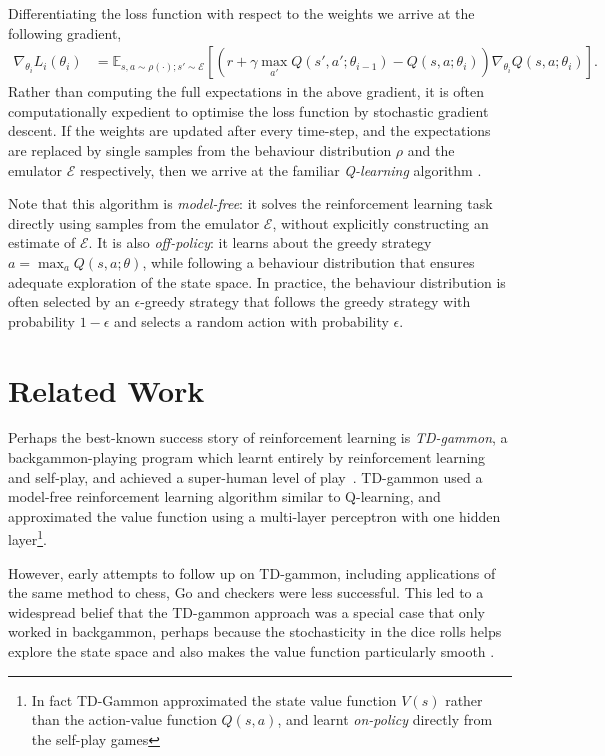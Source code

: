 \documentclass{article} %
\begin{document}
Differentiating the loss function with respect to the weights we arrive at the following gradient,
%
\begin{align}
\nabla_{\theta_i} L_i\left(\theta_i\right) &= \mathbb{E}_{s,a \sim \rho(\cdot); s' \sim \mathcal{E}} \left[ \left( r + \gamma \max_{a'} Q(s', a'; \theta_{i-1}) - Q(s,a ; \theta_i ) \right) \nabla_{\theta_i} Q(s,a;\theta_{i}) \right] .
\label{eq:q-learning-gradient}
\end{align}
%
Rather than computing the full expectations in the above gradient, it is often computationally expedient to optimise the loss function by stochastic gradient descent. If the weights are updated after every time-step, and the expectations are replaced by single samples from the behaviour distribution $\rho$ and the emulator $\mathcal{E}$ respectively, then we arrive at the familiar \emph{Q-learning} algorithm \cite{watkins-qlearning}. 

Note that this algorithm is \emph{model-free}: it solves the reinforcement learning task directly using samples from the emulator $\mathcal{E}$, without explicitly constructing an estimate of $\mathcal{E}$. It is also \emph{off-policy}: it learns about the greedy strategy $a = \max_{a} Q(s,a;\theta)$, while following a behaviour distribution that ensures adequate exploration of the state space. In practice, the behaviour distribution is often selected by an $\epsilon$-greedy strategy that follows the greedy strategy with probability $1 - \epsilon$ and selects a random action with probability $\epsilon$.

\section{Related Work}

Perhaps the best-known success story of reinforcement learning is \emph{TD-gammon}, a backgammon-playing program which learnt entirely by reinforcement learning and self-play, and achieved a super-human level of play~\cite{tesauro-95-backgammon}. TD-gammon used a model-free reinforcement learning algorithm similar to Q-learning, and approximated the value function using a multi-layer perceptron with one hidden layer\footnote{In fact TD-Gammon approximated the state value function $V(s)$ rather than the action-value function $Q(s,a)$, and learnt \emph{on-policy} directly from the self-play games}. 

However, early attempts to follow up on TD-gammon, including applications of the same method to chess, Go and checkers were less successful. This led to a widespread belief that the TD-gammon approach was a special case that only worked in backgammon, perhaps because the stochasticity in the dice rolls helps explore the state space and also makes the value function particularly smooth \cite{pollack:td-gammon}.
\end{document}
